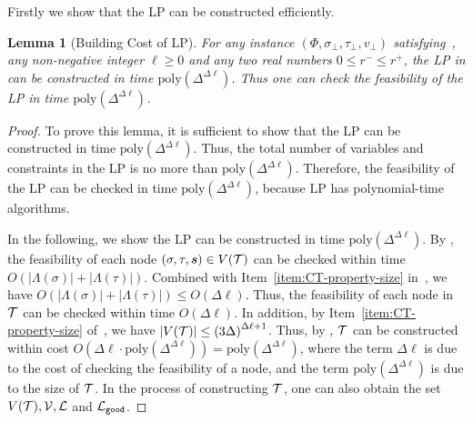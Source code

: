 \documentclass[11pt]{article}
\newtheorem{lemma}[theorem]{Lemma}
\newcommand{\abs}[1]{\left\vert#1\right\vert}
\def\!#1{\mathtt{#1}}
\def\good{\!{good}}
\def\poly{\mathrm{poly}}
\newcommand{\BuildTime}{\poly\left(\Delta^{\Delta\ell}\right)}
\newcommand{\seqS}{\boldsymbol{s}}
\begin{document}
Firstly we show that the LP can be constructed efficiently.
\begin{lemma}[Building Cost of LP] \label{lem:building-cost-of-LP}
    For any instance $(\Phi, \sigma_\bot, \tau_\bot, v_\bot)$ satisfying~, any non-negative integer $\ell \ge 0$ and any two real numbers $0 \le r^- \le r^+$,
    the LP in  can be constructed in time $\poly\left(\Delta^{\Delta \ell}\right)$. Thus one can check the feasibility of the LP in time $\poly\left(\Delta^{\Delta \ell}\right)$.
\end{lemma}
\begin{proof}
    To prove this lemma, it is sufficient to show that the LP can be constructed in time $\poly\left(\Delta^{\Delta \ell}\right)$. 
    Thus, the total number of variables and constraints in the LP is no more than $\poly\left(\Delta^{\Delta \ell}\right)$.
    Therefore, the feasibility of the LP can be checked in time $\poly\left(\Delta^{\Delta \ell}\right)$, because LP has polynomial-time algorithms.

    In the following, we show the LP can be constructed in time $\poly\left(\Delta^{\Delta \ell}\right)$. 
    By ,
    the feasibility of each node $(\sigma,\tau,\seqS)\in V(\+T)$ can be checked within time $O(\abs{\Lambda(\sigma)}+\abs{\Lambda(\tau)})$.
    Combined with Item~\eqref{item:CT-property-size} in~, we have 
    $O(\abs{\Lambda(\sigma)}+\abs{\Lambda(\tau)})\leq O(\Delta\ell)$.
    Thus, the feasibility of each node in $\mathcal{T}$ can be checked within time $O(\Delta\ell)$.
    In addition, by Item~\eqref{item:CT-property-size} of~, 
    we have $\abs{V(\+T)}\leq \left(3\Delta\right)^{\Delta \ell + 1}$.
    Thus, by , $\mathcal{T}$ can be constructed within cost $O\left(\Delta \ell \cdot \BuildTime\right) = \BuildTime$,
    where the term $\Delta \ell$ is due to the cost of checking the feasibility of a node, and the term
    $\BuildTime$ is due to the size of $\mathcal{T}$.
    In the process of constructing $\mathcal{T}$,
    one can also obtain the set $V(\mathcal{T}),\mathcal{V},\mathcal{L}$ and $\+L_{\good}$.
    


\end{proof}
\end{document}
